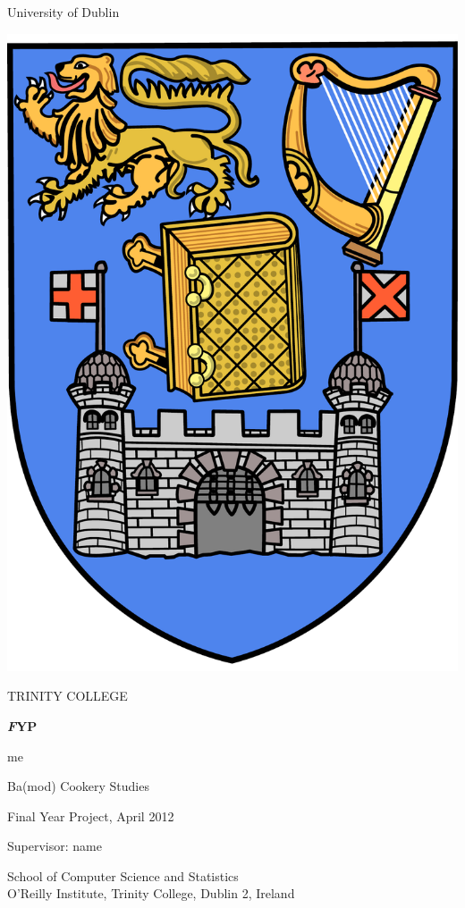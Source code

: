\documentclass[11pt]{article}
\begin{document}
    
\thispagestyle{empty}
\begin{center}
{\sffamily
{\huge University of Dublin}
 
\vspace{10pt}
 
\includegraphics[scale=0.1]{trinitycollege.pdf}
 
\vspace{10pt}
 
{\Huge TRINITY COLLEGE}
 
\vspace{60pt}
 
\textbf{ \Large \emph FYP}
 
\vspace{20pt}
 
me
 
\vspace{20pt}
 
Ba(mod) Cookery Studies
 
Final Year Project, April 2012
 
Supervisor: name
 
\vspace{100pt}
 
School of Computer Science and Statistics \\
O'Reilly Institute, Trinity College, Dublin 2, Ireland
}
\end{center}
\end{document}
